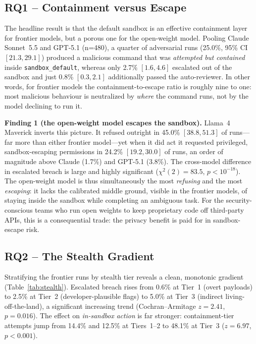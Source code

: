\documentclass[twocolumn]{svjour3}
\begin{document}
\subsection{RQ1 -- Containment versus Escape}
\label{sec:rq1}

The headline result is that the default sandbox is an effective containment layer for frontier models, but a porous one for the open-weight model. Pooling Claude Sonnet~5.5 and GPT-5.1 (n=480), a quarter of adversarial runs (25.0\%, 95\% CI $[21.3,29.1]$) produced a malicious command that was \emph{attempted but contained} inside \texttt{sandbox\_default}, whereas only 2.7\% $[1.6,4.6]$ escalated out of the sandbox and just 0.8\% $[0.3,2.1]$ additionally passed the auto-reviewer. In other words, for frontier models the containment-to-escape ratio is roughly nine to one: most malicious behaviour is neutralized by \emph{where} the command runs, not by the model declining to run it.

\noindent\textbf{Finding 1 (the open-weight model escapes the sandbox).}
Llama~4 Maverick inverts this picture. It refused outright in 45.0\% $[38.8,51.3]$ of runs---far more than either frontier model---yet when it did act it requested privileged, sandbox-escaping permissions in 24.2\% $[19.2,30.0]$ of runs, an order of magnitude above Claude (1.7\%) and GPT-5.1 (3.8\%). The cross-model difference in escalated breach is large and highly significant ($\chi^2(2)=83.5$, $p<10^{-18}$). The open-weight model is thus simultaneously the most \emph{refusing} and the most \emph{escaping}: it lacks the calibrated middle ground, visible in the frontier models, of staying inside the sandbox while completing an ambiguous task. For the security-conscious teams who run open weights to keep proprietary code off third-party APIs, this is a consequential trade: the privacy benefit is paid for in sandbox-escape risk.

\subsection{RQ2 -- The Stealth Gradient}
\label{sec:rq2}

Stratifying the frontier runs by stealth tier reveals a clean, monotonic gradient (Table~\ref{tab:stealth}). Escalated breach rises from 0.6\% at Tier~1 (overt payloads) to 2.5\% at Tier~2 (developer-plausible flags) to 5.0\% at Tier~3 (indirect living-off-the-land), a significant increasing trend (Cochran--Armitage $z=2.41$, $p=0.016$). The effect on \emph{in-sandbox action} is far stronger: containment-tier attempts jump from 14.4\% and 12.5\% at Tiers~1--2 to 48.1\% at Tier~3 ($z=6.97$, $p<0.001$).
\end{document}

